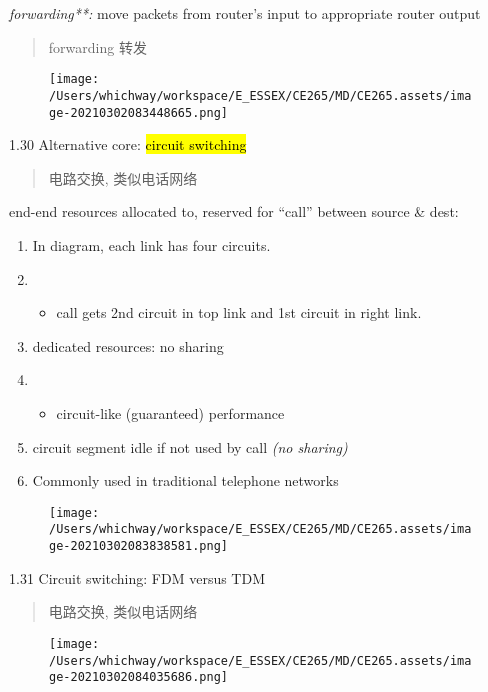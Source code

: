 \documentclass[
]{article}
\begin{document}
\emph{forwarding**:} move packets from router's input to appropriate
router output

\begin{quote}
forwarding 转发
\end{quote}

\begin{figure}
\centering
\texttt{[image: /Users/whichway/workspace/E\_ESSEX/CE265/MD/CE265.assets/image-20210302083448665.png]}
\caption{}
\end{figure}

1.30 Alternative core: \hl{circuit switching}

\begin{quote}
电路交换, 类似电话网络
\end{quote}

end-end resources allocated to, reserved for ``call'' between source \&
dest:

\begin{enumerate}
\def\labelenumi{\arabic{enumi}.}
\item
  In diagram, each link has four circuits.
\item
  \begin{itemize}
  \item
    call gets 2nd circuit in top link and 1st circuit in right link.
  \end{itemize}
\item
  dedicated resources: no sharing
\item
  \begin{itemize}
  \item
    circuit-like (guaranteed) performance
  \end{itemize}
\item
  circuit segment idle if not used by call \emph{(no sharing)}
\item
  Commonly used in traditional telephone networks
\end{enumerate}

\begin{figure}
\centering
\texttt{[image: /Users/whichway/workspace/E\_ESSEX/CE265/MD/CE265.assets/image-20210302083838581.png]}
\caption{}
\end{figure}

1.31 Circuit switching: FDM versus TDM

\begin{quote}
电路交换, 类似电话网络
\end{quote}

\begin{figure}
\centering
\texttt{[image: /Users/whichway/workspace/E\_ESSEX/CE265/MD/CE265.assets/image-20210302084035686.png]}
\caption{}
\end{figure}
\end{document}
